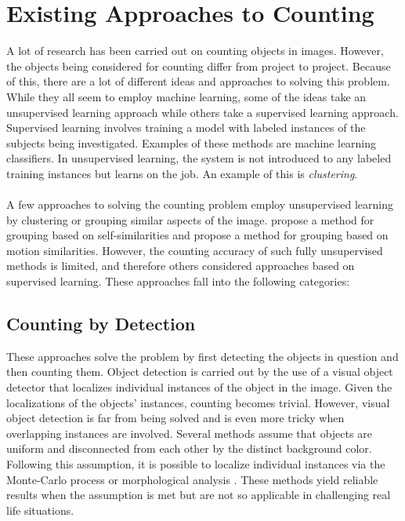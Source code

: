 
\bigskip

\goodbreak

\section{Existing Approaches to Counting}
A lot of research has been carried out on counting objects in images. However, the objects being considered for counting differ from project to project. Because of this, there are a lot of different ideas and approaches to solving this problem. While they all seem to employ machine learning, some of the ideas take an unsupervised learning approach while others take a supervised learning approach. Supervised learning involves training a model with labeled instances of the subjects being investigated. Examples of these methods are machine learning classifiers. In unsupervised learning, the system is not introduced to any labeled training instances but learns on the job. An example of this is \textit{clustering}.\\ \\
%
A few approaches to solving the counting problem employ unsupervised learning by clustering or grouping similar aspects of the image. \cite{REF14} propose a method for grouping based on self-similarities and \cite{REF15} propose a method for grouping based on motion similarities. However, the counting accuracy of such fully unsupervised methods is limited, and therefore others considered approaches based on supervised learning. These approaches fall into the following categories:

\subsection{Counting by Detection}
These approaches solve the problem by first detecting the objects in question and then counting them. Object detection is carried out by the use of a visual object detector that localizes individual instances of the object in the image. Given the localizations of the objects' instances, counting becomes trivial. However, visual object detection is far from being solved and is even more tricky when overlapping instances are involved. Several methods assume that objects are uniform and disconnected from each other by the distinct background color. Following this assumption, it is possible to localize individual instances via the Monte-Carlo process \cite{REF16} or morphological analysis \cite{REF17}. These methods yield reliable results when the assumption is met but are not so applicable in challenging real life situations. 

